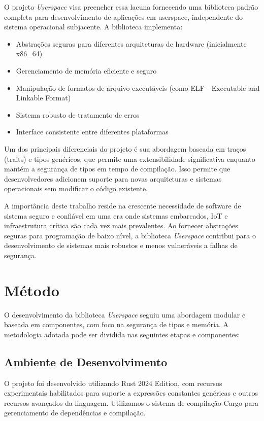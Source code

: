 \documentclass[12pt,a4paper]{article}
\begin{document}
O projeto \textit{Userspace} visa preencher essa lacuna fornecendo uma biblioteca padrão completa para desenvolvimento de aplicações em userspace, independente do sistema operacional subjacente. A biblioteca implementa:

\begin{itemize}
    \item Abstrações seguras para diferentes arquiteturas de hardware (inicialmente x86\_64)
    \item Gerenciamento de memória eficiente e seguro
    \item Manipulação de formatos de arquivo executáveis (como ELF - Executable and Linkable Format)
    \item Sistema robusto de tratamento de erros
    \item Interface consistente entre diferentes plataformas
\end{itemize}

Um dos principais diferenciais do projeto é sua abordagem baseada em traços (traits) e tipos genéricos, que permite uma extensibilidade significativa enquanto mantém a segurança de tipos em tempo de compilação. Isso permite que desenvolvedores adicionem suporte para novas arquiteturas e sistemas operacionais sem modificar o código existente.

A importância deste trabalho reside na crescente necessidade de software de sistema seguro e confiável em uma era onde sistemas embarcados, IoT e infraestrutura crítica são cada vez mais prevalentes. Ao fornecer abstrações seguras para programação de baixo nível, a biblioteca \textit{Userspace} contribui para o desenvolvimento de sistemas mais robustos e menos vulneráveis a falhas de segurança.

\section{Método}

O desenvolvimento da biblioteca \textit{Userspace} seguiu uma abordagem modular e baseada em componentes, com foco na segurança de tipos e memória. A metodologia adotada pode ser dividida nas seguintes etapas e componentes:

\subsection{Ambiente de Desenvolvimento}

O projeto foi desenvolvido utilizando Rust 2024 Edition, com recursos experimentais habilitados para suporte a expressões constantes genéricas e outros recursos avançados da linguagem. Utilizamos o sistema de compilação Cargo para gerenciamento de dependências e compilação.
\end{document}
